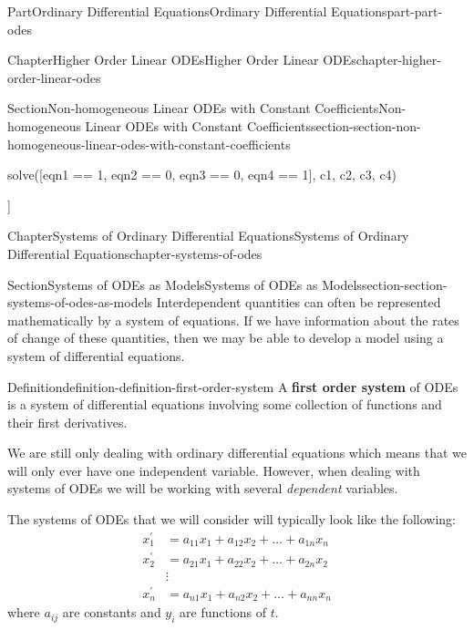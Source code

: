 \documentclass[twoside,10pt,]{book}
\newcommand{\terminology}[1]{\textbf{#1}}
\numberwithin{equation}{part}
\begin{document}
\begin{partptx}{Part}{Ordinary Differential Equations}{}{Ordinary Differential Equations}{}{}{part-part-odes}
\begin{chapterptx}{Chapter}{Higher Order Linear ODEs}{}{Higher Order Linear ODEs}{}{}{chapter-higher-order-linear-odes}
\begin{sectionptx}{Section}{Non-homogeneous Linear ODEs with Constant Coefficients}{}{Non-homogeneous Linear ODEs with Constant Coefficients}{}{}{section-section-non-homogeneous-linear-odes-with-constant-coefficients}
\begin{sageinput}
solve([eqn1 == 1, eqn2 == 0, eqn3 == 0, eqn4 == 1], c1, c2, c3, c4)
\end{sageinput}
\begin{sageoutput}
[[c1 == (1/6), c2 == (2/9), c3 == (-41/3530), c4 == (-43/3530)]]
\end{sageoutput}
\end{sectionptx}
\end{chapterptx}
%
\typeout{************************************************}
\typeout{************************************************}
%
\begin{chapterptx}{Chapter}{Systems of Ordinary Differential Equations}{}{Systems of Ordinary Differential Equations}{}{}{chapter-systems-of-odes}
\renewcommand*{\chaptername}{Chapter}
%
%
\typeout{************************************************}
\typeout{************************************************}
%
\begin{sectionptx}{Section}{Systems of ODEs as Models}{}{Systems of ODEs as Models}{}{}{section-section-systems-of-odes-as-models}
Interdependent quantities can often be represented mathematically by a system of equations. If we have information about the rates of change of these quantities, then we may be able to develop a model using a system of differential equations.%
\begin{definition}{Definition}{}{definition-definition-first-order-system}%
%
A \terminology{first order system} of ODEs is a system of differential equations involving some collection of functions and their first derivatives.%
\end{definition}
We are still only dealing with ordinary differential equations which means that we will only ever have one independent variable. However, when dealing with systems of ODEs we will be working with several \emph{dependent} variables.%
\par
The systems of ODEs that we will consider will typically look like the following:%
\begin{align*}
x_{1}^\prime  &=  a_{11}x_{1} +a_{12}x_{2}+\dots+a_{1n}x_{n}\\
x^\prime_{2}  &=  a_{21}x_{1} + a_{22}x_{2} + \dots + a_{2n}x_{2}\\
&\vdots\\
x^\prime_{n}  &=  a_{n1}x_{1} + a_{n2}x_{2} + \dots + a_{nn}x_{n}
\end{align*}
where \(a_{ij}\) are constants and \(y_{i}\) are functions of \(t\).%

\end{sectionptx}
\end{chapterptx}
\end{partptx}
\end{document}
